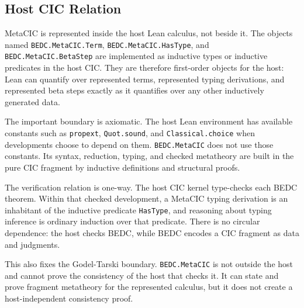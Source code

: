 \subsection{Host CIC Relation}\label{subsec:reconstruction-host-cic-relation}

MetaCIC is represented inside the host Lean calculus, not beside it. The
objects named \texttt{BEDC.MetaCIC.Term}, \texttt{BEDC.MetaCIC.HasType}, and
\texttt{BEDC.MetaCIC.BetaStep} are implemented as inductive types or
inductive predicates in the host CIC. They are therefore first-order objects
for the host: Lean can quantify over represented terms, represented typing
derivations, and represented beta steps exactly as it quantifies over any
other inductively generated data.

The important boundary is axiomatic. The host Lean environment has available
constants such as \texttt{propext}, \texttt{Quot.sound}, and
\texttt{Classical.choice} when developments choose to depend on them.
\texttt{BEDC.MetaCIC} does not use those constants. Its syntax, reduction,
typing, and checked metatheory are built in the pure CIC fragment by
inductive definitions and structural proofs.

The verification relation is one-way. The host CIC kernel type-checks each
BEDC theorem. Within that checked development, a MetaCIC typing derivation is
an inhabitant of the inductive predicate \texttt{HasType}, and reasoning about
typing inference is ordinary induction over that predicate. There is no
circular dependence: the host checks BEDC, while BEDC encodes a CIC fragment
as data and judgments.

This also fixes the Godel-Tarski boundary. \texttt{BEDC.MetaCIC} is not
outside the host and cannot prove the consistency of the host that checks it.
It can state and prove fragment metatheory for the represented calculus, but
it does not create a host-independent consistency proof.

